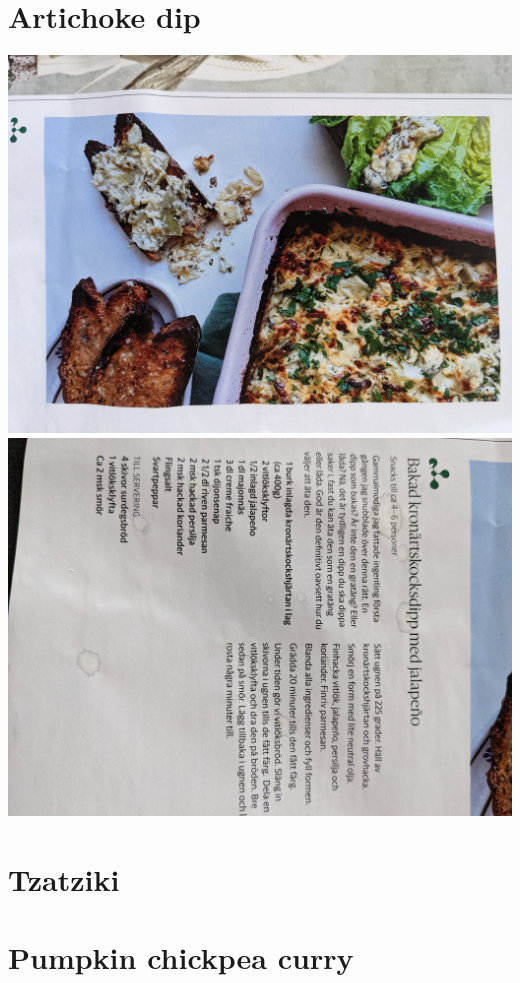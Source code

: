 \documentclass[a4paper,10pt]{article}
\begin{document}
\section{Artichoke dip}
\includegraphics[scale=0.07,angle=90]{./images/artichoke_dip_1.jpg}
\includegraphics[scale=0.07,angle=90]{./images/artichoke_dip_2.jpg}
\newpage

\section{Tzatziki}

\newpage
\section{Pumpkin chickpea curry}
\end{document}
